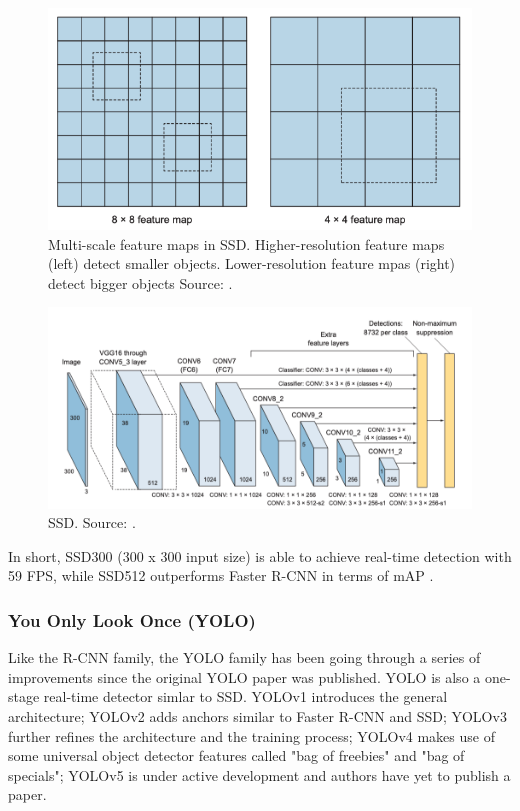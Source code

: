 \documentclass[a4paper,11pt,oneside]{article}
\begin{document}
  \begin{figure}[ht]
    \begin{center}
      \includegraphics[width=.8\textwidth]{ssd_feature_maps.png}
    \end{center}
    \caption{Multi-scale feature maps in SSD. Higher-resolution feature maps (left) detect smaller objects.
    Lower-resolution feature mpas (right) detect bigger objects Source: \cite{elgendy2020deep}.}
  \end{figure}

  \begin{figure}[ht]
    \begin{center}
      \includegraphics[width=.8\textwidth]{ssd.png}
    \end{center}
    \caption{SSD. Source: \cite{elgendy2020deep}.}
  \end{figure}

  In short, SSD300 (300 x 300 input size) is able to achieve real-time detection with 59 FPS, while SSD512 outperforms
  Faster R-CNN in terms of mAP \cite{liu2016ssd}.

  \subsubsection{You Only Look Once (YOLO)}

  Like the R-CNN family, the YOLO family has been going through a series of improvements since the original YOLO paper
  was published. YOLO is also a one-stage real-time detector simlar to SSD. YOLOv1 \cite{redmon2016you} introduces the
  general architecture; YOLOv2 \cite{redmon2017yolo9000} adds anchors similar to Faster R-CNN and SSD; YOLOv3
  \cite{redmon2018yolov3} further refines the architecture and the training process; YOLOv4 \cite{bochkovskiy2020yolov4}
  makes use of some universal object detector features called "bag of freebies" and "bag of specials"; YOLOv5 \cite{yolov5}
  is under active development and authors have yet to publish a paper.
\end{document}
